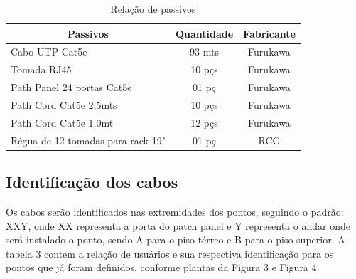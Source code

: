 \documentclass[	DIV=calc,%
							paper=a4,%
							fontsize=12pt,%
							onecolumn]{scrartcl}	 					%
\begin{document}
\begin{table}[H]
	\centering
	\caption{Relação de passivos}
\label{my-label}
\begin{tabular}{|l|c|c|}
	\hline
	\multicolumn{1}{|c|}{\textbf{Passivos}}    & \textbf{Quantidade} & \textbf{Fabricante} \\ \hline
	Cabo UTP Cat5e                             & 93 mts              & Furukawa            \\ \hline
	Tomada RJ45 & 10 pçs               & Furukawa             \\ \hline
	Path Panel 24 portas Cat5e                 & 01 pç                & Furukawa            \\ \hline
	Path Cord Cat5e  2,5mts                    & 10 pçs               & Furukawa            \\ \hline
	Path Cord Cat5e  1,0mt                     & 12 pçs              & Furukawa            \\ \hline
	Régua de 12 tomadas para rack 19"          & 01 pç                & RCG                 \\ \hline
\end{tabular}
\end{table}

\subsection{Identificação dos cabos}
Os cabos serão identificados nas extremidades dos pontos, seguindo o  padrão: XXY, onde XX representa a porta do patch panel e Y representa o andar onde será instalado o ponto, sendo A para o piso térreo e B para o piso superior.
A tabela 3 contem a relação de usuários e sua respectiva identificação para os pontos que já foram definidos, conforme plantas da Figura 3 e Figura 4. 
\end{document}
